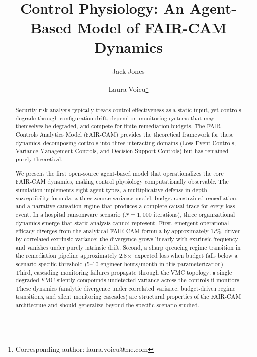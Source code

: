 \documentclass[11pt,a4paper]{article}
\begin{document}
\title{Control Physiology: An Agent-Based Model of FAIR-CAM Dynamics}

\author[1]{Jack Jones}
\author[2]{Laura Voicu\thanks{Corresponding author: laura.voicu@me.com}}

\date{}

\maketitle

\begin{abstract}
Security risk analysis typically treats control effectiveness as a static input, yet controls degrade through configuration drift, depend on monitoring systems that may themselves be degraded, and compete for finite remediation budgets. The FAIR Controls Analytics Model (FAIR-CAM) provides the theoretical framework for these dynamics, decomposing controls into three interacting domains (Loss Event Controls, Variance Management Controls, and Decision Support Controls) but has remained purely theoretical.

We present the first open-source agent-based model that operationalizes the core FAIR-CAM dynamics, making control physiology computationally observable. The simulation implements eight agent types, a multiplicative defense-in-depth susceptibility formula, a three-source variance model, budget-constrained remediation, and a narrative causation engine that produces a complete causal trace for every loss event. In a hospital ransomware scenario ($N=1{,}000$ iterations), three organizational dynamics emerge that static analysis cannot represent. First, emergent operational efficacy diverges from the analytical FAIR-CAM formula by approximately 17\%, driven by correlated extrinsic variance; the divergence grows linearly with extrinsic frequency and vanishes under purely intrinsic drift. Second, a sharp queueing regime transition in the remediation pipeline approximately $2.8\times$ expected loss when budget falls below a scenario-specific threshold (5--10 engineer-hours/month in this parameterization). Third, cascading monitoring failures propagate through the VMC topology: a single degraded VMC silently compounds undetected variance across the controls it monitors. These dynamics (analytic divergence under correlated variance, budget-driven regime transitions, and silent monitoring cascades) are structural properties of the FAIR-CAM architecture and should generalize beyond the specific scenario studied.
\end{abstract}
\end{document}
